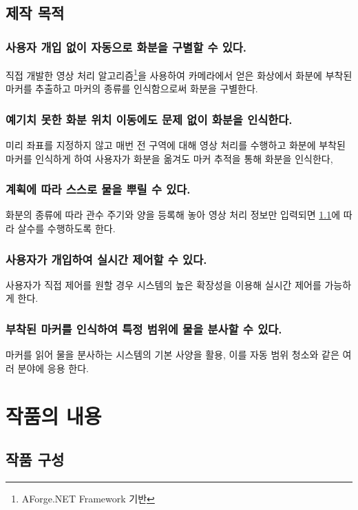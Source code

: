 \documentclass[chapter,11pt,oneside,openany]{xoblivoir}
\begin{document}
\section{제작 목적}

\subsection{사용자 개입 없이 자동으로 화분을 구별할 수 있다.}
\label{autoDetect}
직접 개발한 영상 처리 알고리즘\footnote{AForge.NET Framework 기반}을 사용하여 카메라에서 얻은 화상에서
화분에 부착된 마커를 추출하고 마커의 종류를 인식함으로써 화분을 구별한다.


\subsection{예기치 못한 화분 위치 이동에도 문제 없이 화분을 인식한다.}
미리 좌표를 지정하지 않고 매번 전 구역에 대해 영상 처리를 수행하고 화분에 부착된 마커를 인식하게 하여
사용자가 화분을 옮겨도 마커 추적을 통해 화분을 인식한다,

\subsection{계획에 따라 스스로 물을 뿌릴 수 있다.}
화분의 종류에 따라 관수 주기와 양을 등록해 놓아 영상 처리 정보만 입력되면
\ref{autoDetect}에 따라 살수를 수행하도록 한다.

\subsection{사용자가 개입하여 실시간 제어할 수 있다.}
사용자가 직접 제어를 원할 경우 시스템의 높은 확장성을 이용해
실시간 제어를 가능하게 한다.

\subsection{부착된 마커를 인식하여 특정 범위에 물을 분사할 수 있다.}
마커를 읽어 물을 분사하는 시스템의 기본 사양을 활용,
이를 자동 범위 청소와 같은 여러 분야에 응용 한다.


\chapter{작품의 내용}

\section{작품 구성}
\end{document}
